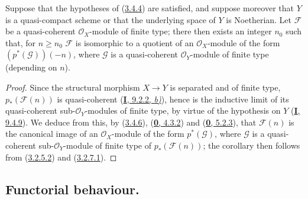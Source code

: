 \begin{corollary}[3.4.8]
\label{II.3.4.8}
Suppose that the hypotheses of \textup{(\hyperref[II.3.4.4]{3.4.4})} are satisfied,
and suppose moreover that $Y$ is a quasi-compact scheme or that the
underlying space of $Y$ is Noetherian. Let $\mathcal{F}$ be a
quasi-coherent $\mathcal{O}_X$-module of finite type; there then exists an
integer $n_0$ such that, for $n\geq n_0$ $\mathcal{F}$ is isomorphic to a
quotient of an $\mathcal{O}_X$-module of the form $(p^*(\mathcal{G}))(-n)$,
where $\mathcal{G}$ is a quasi-coherent $\mathcal{O}_Y$-module of finite type
(depending on $n$).
\end{corollary}

\begin{proof}
Since the structural morphism $X\to Y$ is separated and of finite type,
$p_*(\mathcal{F}(n))$ is quasi-coherent
(\hyperref[I.9.2.2]{\textbf{I}, 9.2.2, \emph{b)}}), hence is the inductive limit of its
quasi-coherent sub-$\mathcal{O}_Y$-modules of finite type, by virtue of
the hypothesis on $Y$ (\hyperref[I.9.4.9]{\textbf{I}, 9.4.9}). We deduce from this,
by (\hyperref[II.3.4.6]{3.4.6}),
(\hyperref[0.4.3.2]{\textbf{0}, 4.3.2}) and
(\hyperref[0.5.2.3]{\textbf{0}, 5.2.3}), that $\mathcal{F}(n)$ is the canonical
image of an $\mathcal{O}_X$-module of the form $p^*(\mathcal{G})$, where
$\mathcal{G}$ is a quasi-coherent sub-$\mathcal{O}_Y$-module of finite type of
$p_*(\mathcal{F}(n))$; the corollary then follows from
(\hyperref[II.3.2.5.2]{3.2.5.2}) and
(\hyperref[II.3.2.7.1]{3.2.7.1}).
\end{proof}

\subsection{Functorial behaviour.}
\label{subsection:II.3.5}

